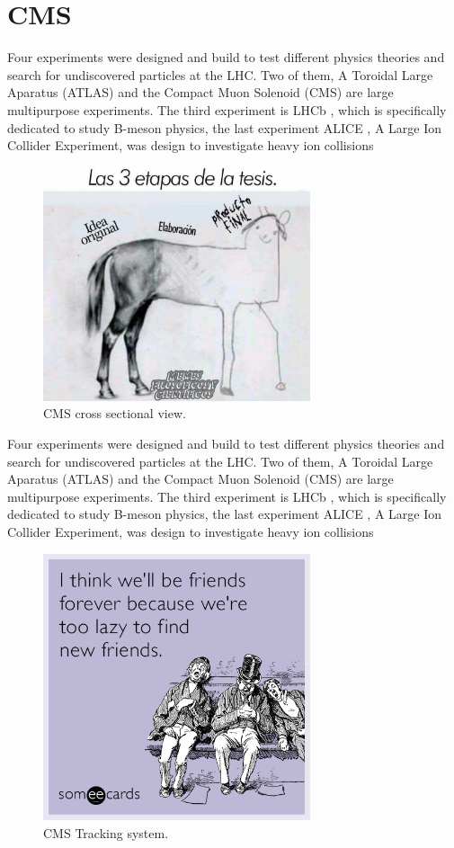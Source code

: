 \section{CMS}
Four experiments were designed and build to test different physics theories and search for undiscovered particles at the LHC. Two of them, A Toroidal Large Aparatus (ATLAS)\cite{atlas} and the Compact Muon Solenoid (CMS)\cite{cms_doc} are large multipurpose experiments. The third experiment is LHCb \cite{lhcb}, which is specifically dedicated to study B-meson physics, the last experiment ALICE \cite{alice}, A Large Ion Collider Experiment, was design to investigate heavy ion collisions
\begin{figure}[!h]
  \centering
  \includegraphics[width=0.7\textwidth]{../images/ch2/10}
  \caption[CMS cross sectional view]{CMS cross sectional view.}\label{fig:cms_layout}
\end{figure}
Four experiments were designed and build to test different physics theories and search for undiscovered particles at the LHC. Two of them, A Toroidal Large Aparatus (ATLAS)\cite{atlas} and the Compact Muon Solenoid (CMS)\cite{cms_doc} are large multipurpose experiments. The third experiment is LHCb \cite{lhcb}, which is specifically dedicated to study B-meson physics, the last experiment ALICE \cite{alice}, A Large Ion Collider Experiment, was design to investigate heavy ion collisions
\begin{figure}[!h]
  \centering
  \includegraphics[width=0.7\textwidth]{../images/ch2/3}
  \caption[CMS Tracking system.]{CMS Tracking system.}\label{fig:cms_layout}
\end{figure}

